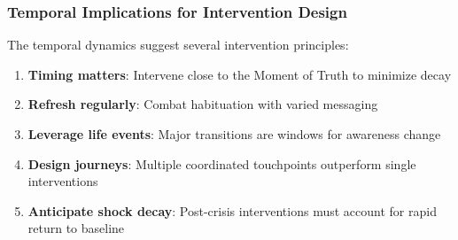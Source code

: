 \subsubsection{Temporal Implications for Intervention Design}

The temporal dynamics suggest several intervention principles:

\begin{enumerate}
    \item \textbf{Timing matters}: Intervene close to the Moment of Truth 
          to minimize decay
    \item \textbf{Refresh regularly}: Combat habituation with varied messaging
    \item \textbf{Leverage life events}: Major transitions are windows for 
          awareness change
    \item \textbf{Design journeys}: Multiple coordinated touchpoints 
          outperform single interventions
    \item \textbf{Anticipate shock decay}: Post-crisis interventions must 
          account for rapid return to baseline
\end{enumerate}
